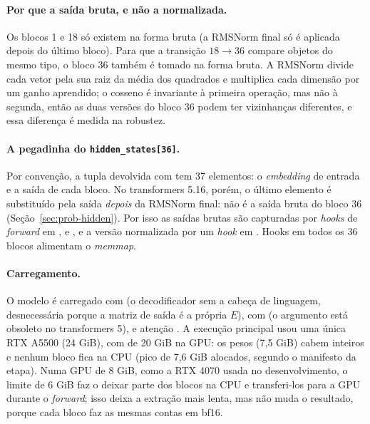 \paragraph{Por que a saída bruta, e não a normalizada.} Os blocos 1 e 18 só existem na forma
bruta (a RMSNorm final só é aplicada depois do último bloco). Para que a transição
$18\to36$ compare objetos do mesmo tipo, o bloco 36 também é tomado na forma bruta. A RMSNorm
divide cada vetor pela sua raiz da média dos quadrados e multiplica cada dimensão por um ganho
aprendido; o cosseno é invariante à primeira operação, mas não à segunda, então as duas
versões do bloco 36 podem ter vizinhanças diferentes, e essa diferença é medida na robustez.

\paragraph{A pegadinha do \texttt{hidden\_states[36]}.} Por convenção, a tupla
 devolvida com  tem 37 elementos: o
\emph{embedding} de entrada e a saída de cada bloco. No transformers 5.16, porém, o último
elemento é substituído pela saída \emph{depois} da RMSNorm final:  não
é a saída bruta do bloco 36 (Seção~\ref{sec:prob-hidden}). Por isso as saídas brutas são
capturadas por \emph{hooks} de \emph{forward} em ,  e
, e a versão normalizada por um \emph{hook} em . Hooks em todos os
36 blocos alimentam o \emph{memmap}.

\paragraph{Carregamento.} O modelo é carregado com  (o decodificador sem a cabeça
de linguagem, desnecessária porque a matriz de saída é a própria $E$), com
 (o argumento  está obsoleto no transformers 5),
 e atenção . A execução principal usou uma única RTX A5500
(24 GiB), com  de 20 GiB na GPU: os pesos (7,5 GiB) cabem inteiros e nenhum
bloco fica na CPU (pico de 7,6 GiB alocados, segundo o manifesto da etapa). Numa GPU de 8 GiB,
como a RTX 4070 usada no desenvolvimento, o limite de 6 GiB faz o  deixar
parte dos blocos na CPU e transferi-los para a GPU durante o \emph{forward}; isso deixa a
extração mais lenta, mas não muda o resultado, porque cada bloco faz as mesmas contas em bf16.

